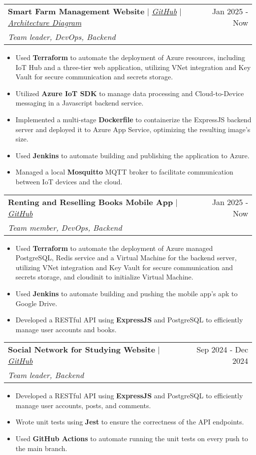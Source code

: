 \documentclass[letterpaper,11pt]{article}
\makeatletter
\newcommand{\resumeItem}[1]{
  \item\small{
    {#1 \vspace{-2pt}}
  }
}
\newcommand{\resumeProjectHeading}[4]{
    \vspace{-2pt}\item
    \begin{tabular*}{0.97\textwidth}{l@{\extracolsep{\fill}}r}
      #1 & \small#2 \\
      \textit{\small#3} & \small #4 \\
    \end{tabular*}\vspace{-7pt}
}
\newcommand{\resumeItemListStart}{\begin{itemize}}
\newcommand{\resumeItemListEnd}{\end{itemize}\vspace{-5pt}}
\makeatother
\begin{document}
      \resumeProjectHeading
        {\textbf{Smart Farm Management Website} $|$ \emph{\href{https://github.com/kng1259/IOT-project}{GitHub}} $|$ \emph{\href{https://drive.google.com/file/d/1EoGsjEHycOAPmUl10ieyaEXncYd-JI56/view?usp=sharing}{Architecture Diagram}}}{Jan 2025 - Now}
        {Team leader, DevOps, Backend}{}
          \resumeItemListStart
            \resumeItem{Used \textbf{Terraform} to automate the deployment of Azure resources, including IoT Hub and a three-tier web application, utilizing VNet integration and Key Vault for secure communication and secrets storage.}
            \resumeItem{Utilized \textbf{Azure IoT SDK} to manage data processing and Cloud-to-Device messaging in a Javascript backend service.}
            \resumeItem{Implemented a multi-stage \textbf{Dockerfile} to containerize the ExpressJS backend server and deployed it to Azure App Service, optimizing the resulting image's size.}
            \resumeItem{Used \textbf{Jenkins} to automate building and publishing the application to Azure.}
            \resumeItem{Managed a local \textbf{Mosquitto} MQTT broker to facilitate communication between IoT devices and the cloud.}
          \resumeItemListEnd
      
      \resumeProjectHeading
        {\textbf{Renting and Reselling Books Mobile App} $|$ \emph{\href{https://github.com/btram11/Mobile-242}{GitHub}}}{Jan 2025 - Now}
        {Team member, DevOps, Backend}{}
          \resumeItemListStart
            \resumeItem{Used \textbf{Terraform} to automate the deployment of Azure managed PostgreSQL, Redis service and a Virtual Machine for the backend server, utilizing VNet integration and Key Vault for secure communication and secrets storage, and cloudinit to initialize Virtual Machine.}
            \resumeItem{Used \textbf{Jenkins} to automate building and pushing the mobile app's apk to Google Drive.}
            \resumeItem{Developed a {RESTful API} using \textbf{ExpressJS} and PostgreSQL to efficiently manage user accounts and books.}
          \resumeItemListEnd

      \resumeProjectHeading
        {\textbf{Social Network for Studying Website} $|$ \emph{\href{https://github.com/NguyenVu04/Do_An}{GitHub}}}{Sep 2024 - Dec 2024}
        {Team leader, Backend}{}
          \resumeItemListStart
            \resumeItem{Developed a {RESTful API} using \textbf{ExpressJS} and PostgreSQL to efficiently manage user accounts, posts, and comments.}
            \resumeItem{Wrote unit tests using \textbf{Jest} to ensure the correctness of the API endpoints.}
            \resumeItem{Used \textbf{GitHub Actions} to automate running the unit tests on every push to the main branch.}
          \resumeItemListEnd
\end{document}
